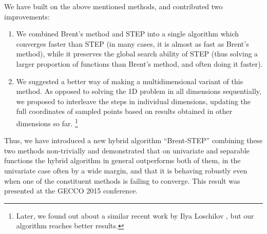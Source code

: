 We have built on the above mentioned methods, and contributed two improvements:

\begin{enumerate}
	\item We combined Brent's method and STEP into a single algorithm which converges faster than STEP (in many cases, it is almost as fast as Brent's method), while it preserves the global search ability of STEP (thus solving a larger proportion of functions than Brent's method, and often doing it faster).

	\item We suggested a better way of making a multidimensional variant of this method. As opposed to solving the 1D problem in all dimensions sequentially, we proposed to interleave the steps in individual dimensions, updating the full coordinates of sampled points based on results obtained in other dimensions so far.%
\footnote{Later, we found out about a similar recent work by Ilya Loschilov \cite{HCMA}, but our algorithm reaches better results.}
\end{enumerate}

Thus, we have introduced a new hybrid algorithm ``Brent-STEP'' combining
these two methods non-trivially and demonstrated that
on univariate and separable functions the hybrid algorithm
in general outperforms both of them,
in the univariate case often by a wide margin,
and that it is behaving robustly even when one of the constituent methods
is failing to converge.
This result was presented at the GECCO 2015 conference.
\citep{ndsqistep}
